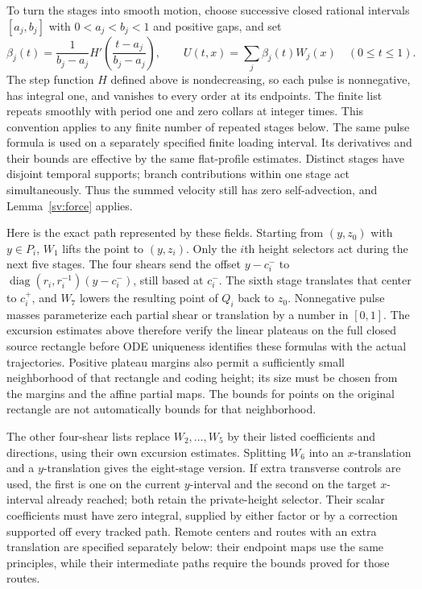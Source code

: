 To turn the stages into smooth motion, choose successive closed
rational intervals $[a_j,b_j]$ with $0<a_j<b_j<1$ and positive gaps,
and set
\begin{equation}\label{sv:pulse-convention}
 \beta_j(t)=\frac1{b_j-a_j}
 H'\!\left(\frac{t-a_j}{b_j-a_j}\right),\qquad
 U(t,x)=\sum_j\beta_j(t)W_j(x)\quad(0\le t\le1).
\end{equation}
The step function $H$ defined above is nondecreasing, so each pulse
is nonnegative, has integral one, and vanishes to every order at its
endpoints.  The finite list repeats smoothly with period one and zero
collars at integer times.  This convention applies to any finite number
of repeated stages below.  The same pulse formula is used on a
separately specified finite loading interval.  Its derivatives and
their bounds are effective by the same flat-profile estimates.  Distinct stages have disjoint temporal
supports; branch contributions within one stage act simultaneously.
Thus the summed velocity still has zero self-advection, and
Lemma~\ref{sv:force} applies.

Here is the exact path represented by these fields.  Starting from
$(y,z_0)$ with $y\in P_i$, $W_1$ lifts the point to $(y,z_i)$.
Only the $i$th height selectors act during the next five stages.
The four shears send the offset $y-c_i^-$ to
$\operatorname{diag}(r_i,r_i^{-1})(y-c_i^-)$, still based at
$c_i^-$.  The sixth stage translates that center to $c_i^+$, and
$W_7$ lowers the resulting point of $Q_i$ back to $z_0$.
Nonnegative pulse masses parameterize each partial shear or translation
by a number in $[0,1]$.  The excursion estimates above therefore
verify the linear plateaus on the full closed source rectangle before
ODE uniqueness identifies these formulas with the actual trajectories.
Positive plateau margins also permit a sufficiently small neighborhood
of that rectangle and coding height; its size must be chosen from the
margins and the affine partial maps.  The bounds for points on the
original rectangle are not automatically bounds for that neighborhood.

The other four-shear lists replace $W_2,\ldots,W_5$ by their listed
coefficients and directions, using their own excursion estimates.
Splitting $W_6$ into an $x$-translation and a $y$-translation gives the
eight-stage version.  If extra transverse controls are used, the first
is one on the current $y$-interval and the second on the target
$x$-interval already reached; both retain the private-height selector.
Their scalar coefficients must have zero integral, supplied by either
factor or by a correction supported off every tracked path.  Remote
centers and routes with an extra translation are specified separately
below: their endpoint maps use the same principles, while their
intermediate paths require the bounds proved for those routes.
